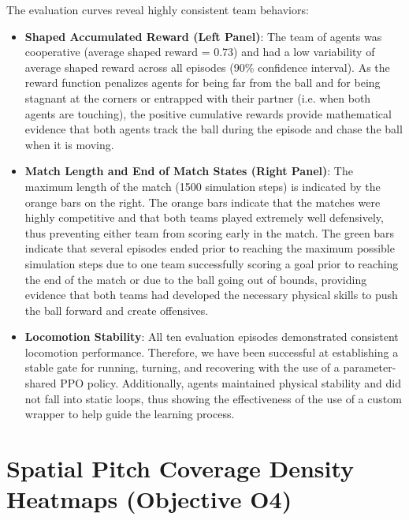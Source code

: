 The evaluation curves reveal highly consistent team behaviors:
\begin{itemize}
    \item \textbf{Shaped Accumulated Reward (Left Panel)}: The team of agents was cooperative (average shaped reward = 0.73) and had a low variability of average shaped reward across all episodes (90\% confidence interval). As the reward function penalizes agents for being far from the ball and for being stagnant at the corners or entrapped with their partner (i.e. when both agents are touching), the positive cumulative rewards provide mathematical evidence that both agents track the ball during the episode and chase the ball when it is moving.
    \item \textbf{Match Length and End of Match States (Right Panel)}: The maximum length of the match (1500 simulation steps) is indicated by the orange bars on the right. The orange bars indicate that the matches were highly competitive and that both teams played extremely well defensively, thus preventing either team from scoring early in the match. The green bars indicate that several episodes ended prior to reaching the maximum possible simulation steps due to one team successfully scoring a goal prior to reaching the end of the match or due to the ball going out of bounds, providing evidence that both teams had developed the necessary physical skills to push the ball forward and create offensives.
    \item \textbf{Locomotion Stability}: All ten evaluation episodes demonstrated consistent locomotion performance. Therefore, we have been successful at establishing a stable gate for running, turning, and recovering with the use of a parameter-shared PPO policy. Additionally, agents maintained physical stability and did not fall into static loops, thus showing the effectiveness of the use of a custom wrapper to help guide the learning process.
\end{itemize}

\section{Spatial Pitch Coverage Density Heatmaps (Objective O4)}
\label{sec:results_spatial_heatmap}

